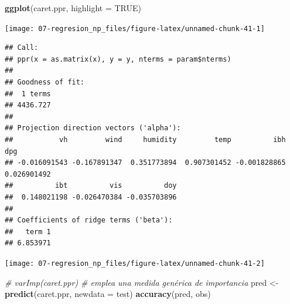 \documentclass[
]{book}
\newenvironment{Shaded}{\begin{snugshade}}{\end{snugshade}}
\newcommand{\CommentTok}[1]{\textcolor[rgb]{0.56,0.35,0.01}{\textit{#1}}}
\newcommand{\DataTypeTok}[1]{\textcolor[rgb]{0.13,0.29,0.53}{#1}}
\newcommand{\KeywordTok}[1]{\textcolor[rgb]{0.13,0.29,0.53}{\textbf{#1}}}
\newcommand{\NormalTok}[1]{#1}
\newcommand{\OperatorTok}[1]{\textcolor[rgb]{0.81,0.36,0.00}{\textbf{#1}}}
\newcommand{\OtherTok}[1]{\textcolor[rgb]{0.56,0.35,0.01}{#1}}
\newcommand{\StringTok}[1]{\textcolor[rgb]{0.31,0.60,0.02}{#1}}
\theoremstyle{break}
\theoremstyle{definition}
\theoremstyle{definition}
\theoremstyle{definition}
\theoremstyle{remark}
\begin{document}
\begin{Shaded}
\begin{Highlighting}[]
\KeywordTok{ggplot}\NormalTok{(caret.ppr, }\DataTypeTok{highlight =} \OtherTok{TRUE}\NormalTok{)}
\end{Highlighting}
\end{Shaded}

\begin{center}\texttt{[image: 07-regresion\_np\_files/figure-latex/unnamed-chunk-41-1]} \end{center}

\begin{Shaded}
\end{Shaded}

\begin{verbatim}
## Call:
## ppr(x = as.matrix(x), y = y, nterms = param$nterms)
## 
## Goodness of fit:
##  1 terms 
## 4436.727 
## 
## Projection direction vectors ('alpha'):
##           vh         wind     humidity         temp          ibh          dpg 
## -0.016091543 -0.167891347  0.351773894  0.907301452 -0.001828865  0.026901492 
##          ibt          vis          doy 
##  0.148021198 -0.026470384 -0.035703896 
## 
## Coefficients of ridge terms ('beta'):
##   term 1 
## 6.853971
\end{verbatim}

\begin{Shaded}
\end{Shaded}

\begin{center}\texttt{[image: 07-regresion\_np\_files/figure-latex/unnamed-chunk-41-2]} \end{center}

\begin{Shaded}
\begin{Highlighting}[]
\CommentTok{# varImp(caret.ppr) # emplea una medida genérica de importancia}
\NormalTok{pred <-}\StringTok{ }\KeywordTok{predict}\NormalTok{(caret.ppr, }\DataTypeTok{newdata =}\NormalTok{ test)}
\KeywordTok{accuracy}\NormalTok{(pred, obs)}
\end{Highlighting}
\end{Shaded}
\end{document}
